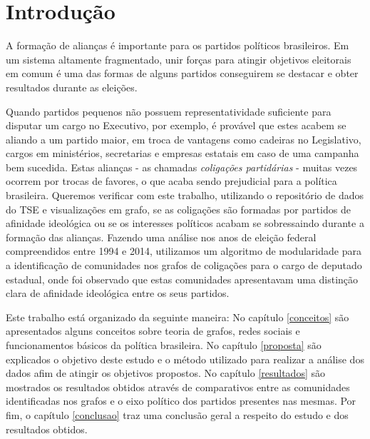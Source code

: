 \chapter{Introdução}
\label{introducao}
\setcounter{page}{7} %



\begin{comment}Por outro lado, existem também o cenário em que partidos pequenos são ideologicamente consistentes e se unem a partidos com ideais e objetivos em comum. \end{comment}

A formação de alianças é importante para os partidos políticos brasileiros. Em um sistema altamente fragmentado, unir forças para atingir objetivos eleitorais em comum é uma das formas de alguns partidos conseguirem se destacar e obter resultados durante as eleições.

Quando partidos pequenos não possuem representatividade suficiente para disputar um cargo no Executivo, por exemplo, é provável que estes acabem se aliando a um partido maior, em troca de vantagens como cadeiras no Legislativo, cargos em ministérios, secretarias e empresas estatais em caso de uma campanha bem sucedida. Estas alianças - as chamadas \emph{coligações partidárias} - muitas vezes ocorrem por trocas de favores, o que acaba sendo prejudicial para a política brasileira. Queremos verificar com este trabalho, utilizando o repositório de dados do TSE e visualizações em grafo, se as coligações são formadas por partidos de afinidade ideológica ou se os interesses políticos acabam se sobressaindo durante a formação das alianças. Fazendo uma análise nos anos de eleição federal compreendidos entre 1994 e 2014, utilizamos um algoritmo de modularidade para a identificação de comunidades nos grafos de coligações para o cargo de deputado estadual, onde foi observado que estas comunidades apresentavam uma distinção clara de afinidade ideológica entre os seus partidos.

Este trabalho está organizado da seguinte maneira: No capítulo \ref{conceitos} são apresentados alguns conceitos  sobre teoria de grafos, redes sociais e funcionamentos básicos da política brasileira. No capítulo \ref{proposta} são explicados o objetivo deste estudo e o método utilizado para realizar a análise dos dados afim de atingir os objetivos propostos. No capítulo \ref{resultados} são mostrados os resultados obtidos através de comparativos entre as comunidades identificadas nos grafos e o eixo político dos partidos presentes nas mesmas. Por fim, o capítulo \ref{conclusao} traz uma conclusão geral a respeito do estudo e dos resultados obtidos.


